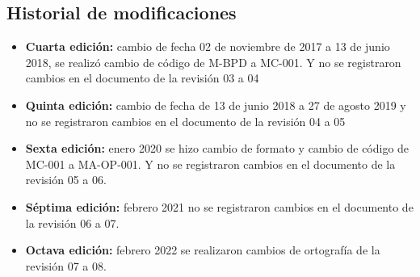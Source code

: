 \subsection{Historial de modificaciones}

\begin{itemize}
	\item \textbf{Cuarta edición:} cambio de fecha 02 de noviembre de 2017 a 13 de junio 2018, se realizó cambio de código de M-BPD a MC-001. Y no se registraron cambios en el documento de la revisión 03 a 04
	\item \textbf{Quinta edición:} cambio de fecha de 13 de junio 2018 a 27 de agosto 2019 y no se registraron cambios en el documento de la revisión 04 a 05
	\item \textbf{Sexta edición:} enero 2020 se hizo cambio de formato y cambio de código de MC-001 a MA-OP-001. Y no se registraron cambios en el documento de la revisión 05 a 06.
	\item \textbf{Séptima edición:} febrero 2021 no se registraron cambios en el documento de la revisión 06 a 07.
	\item \textbf{Octava edición:} febrero 2022 se realizaron cambios de ortografía de la revisión 07 a 08.
\end{itemize}